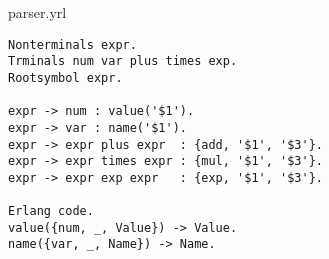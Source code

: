 \begin{frame}[fragile]{parser.yrl}
\begin{verbatim}
Nonterminals expr.
Trminals num var plus times exp.
Rootsymbol expr.

expr -> num : value('$1').
expr -> var : name('$1').
expr -> expr plus expr  : {add, '$1', '$3'}.
expr -> expr times expr : {mul, '$1', '$3'}.
expr -> expr exp expr   : {exp, '$1', '$3'}.

Erlang code.
value({num, _, Value}) -> Value.
name({var, _, Name}) -> Name.
\end{verbatim}
\end{frame}




